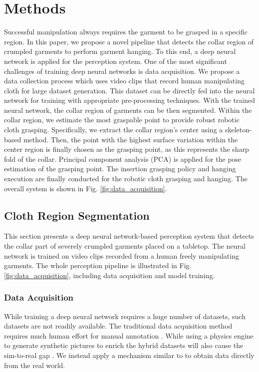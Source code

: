 \documentclass[letterpaper, 10 pt, conference]{ieeeconf}  %
\begin{document}
\section{Methods}
Successful manipulation always requires the garment to be grasped in a specific region. In this paper, we propose a novel pipeline that detects the collar region of crumpled garments to perform garment hanging. To this end, a deep neural network is applied for the perception system. One of the most significant challenges of training deep neural networks is data acquisition. We propose a
data collection process which uses video clips that record human manipulating cloth for large dataset generation. This dataset can be directly fed into the neural network for training with appropriate pre-processing techniques.
With the trained neural network, the collar region of garments can be then segmented. Within the collar region, we estimate the most graspable point to provide robust robotic cloth grasping. Specifically, we extract the collar region's center using a skeleton-based method. Then, the point with the highest surface variation within the center region is finally chosen as the grasping point, as this represents the sharp fold of the collar. Principal component analysis (PCA) is applied for the pose estimation of the grasping point. The insertion grasping policy and hanging execution are finally conducted for the robotic cloth grasping and hanging. The overall system is shown in Fig. \ref{fig:data_acquisition}.

\subsection{Cloth Region Segmentation}
This section presents a deep neural network-based perception system that detects the collar part of severely crumpled garments placed on a tabletop. The neural network is trained on video clips recorded from a human freely manipulating garments. The whole perception pipeline is illustrated in Fig. \ref{fig:data_acquisition}, including data acquisition and model training.

\subsubsection{Data Acquisition}
While training a deep neural network requires a huge number of datasets, such datasets are not readily available. The traditional data acquisition method requires much human effort for manual annotation \cite{ramisa2012using}. While using a physics engine to generate synthetic pictures to enrich the hybrid datasets will also cause the sim-to-real gap \cite{zhang2020learning}.
We instead apply a mechanism similar to \cite{qian2020cloth} to obtain data directly from the real world.
\end{document}
